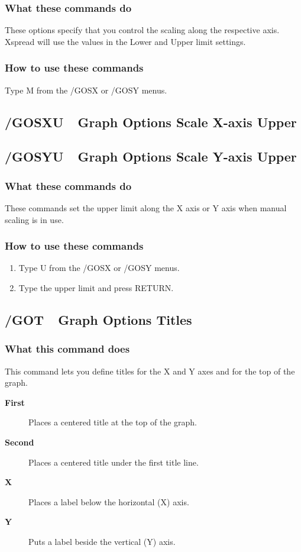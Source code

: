 \subsubsection*{What these commands do}
These options specify that you control the scaling along the 
respective axis.  Xspread will use the values in the Lower and Upper 
limit settings.

\subsubsection*{How to use these commands}
Type M from the /GOSX or /GOSY menus.

\subsection*{/GOSXU\ \   Graph Options Scale X-axis Upper}
\subsection*{/GOSYU\ \   Graph Options Scale Y-axis Upper}

\subsubsection*{What these commands do}
These commands set the upper limit along the X axis or Y axis when 
manual scaling is in use.

\subsubsection*{How to use these commands}
\begin{enumerate}
\item{Type U from the /GOSX or /GOSY menus.}
\item{Type the upper limit and press RETURN.}
\end{enumerate}
 
\subsection*{/GOT\ \     Graph Options Titles}

\subsubsection*{What this command does}
This command lets you define titles for the X and Y axes and for the 
top of the graph.
\begin{description}
\item[{\bf First   }]{Places a centered title at the top of the graph.}
\item[{\bf Second  }]{Places a centered title under the first title line.}
\item[{\bf X       }]{Places a label below the horizontal (X) axis.}
\item[{\bf Y       }]{Puts a label beside the vertical (Y) axis.}
\end{description}

